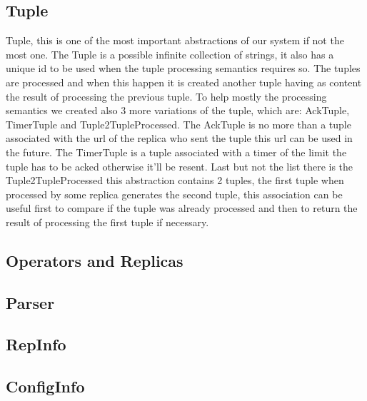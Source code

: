 \documentclass[times, 10pt, twocolumn]{article}
\begin{document}
\subsection{Tuple}
Tuple, this is one of the most important abstractions of our system if not the most one. The Tuple is a possible infinite collection of strings, it also has a unique id to be used when the tuple processing semantics requires so. The tuples are processed and when this happen it is created another tuple having as content the result of processing the previous tuple. To help mostly the processing semantics we created also 3 more variations of the tuple, which are: AckTuple, TimerTuple and Tuple2TupleProcessed. The AckTuple is no more than a tuple associated with the url of the replica who sent the tuple this url can be used in the future. The TimerTuple is a tuple associated with a timer of the limit the tuple has to be acked otherwise it'll be resent. Last but not the list there is the Tuple2TupleProcessed this abstraction contains 2 tuples, the first tuple when processed by some replica generates the second tuple, this association can be useful first to compare if the tuple was already processed and then to return the result of processing the first tuple if necessary.



\subsection{Operators and Replicas}





\subsection{Parser}





\subsection{RepInfo}






\subsection{ConfigInfo}
\end{document}
